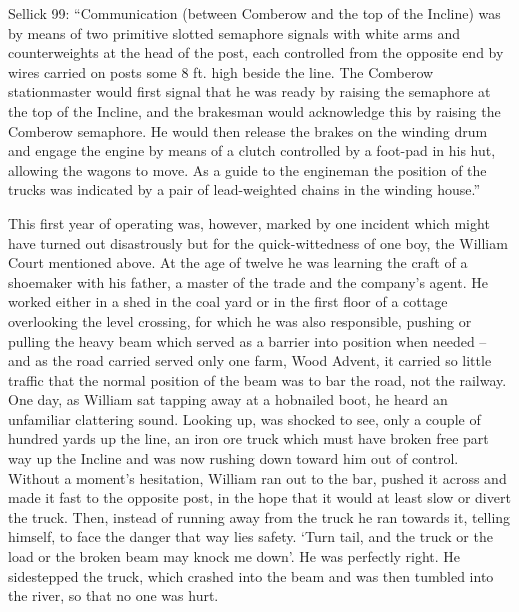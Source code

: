 \documentclass[11pt]{book}
\begin{document}
Sellick 99: “Communication (between Comberow and the top of the Incline) was by means of two primitive slotted semaphore signals with white arms and counterweights at the head of the post, each controlled from the opposite end by wires carried on posts some 8 ft. high beside the line. The Comberow stationmaster would first signal that he was ready by raising the semaphore at the top of the Incline, and the brakesman would acknowledge this by raising the Comberow semaphore. He would then release the brakes on the winding drum and engage the engine by means of a clutch controlled by a foot-pad in his hut, allowing the wagons to move. As a guide to the engineman the position of the trucks was indicated by a pair of lead-weighted chains in the winding house.”

This first year of operating was, however, marked by one incident which might have turned out disastrously but for the quick-wittedness of one boy, the William Court mentioned above. At the age of twelve he was learning the craft of a shoemaker with his father, a master of the trade and the company’s agent. He worked either in a shed in the coal yard or in the first floor of a cottage overlooking the level crossing, for which he was also responsible, pushing or pulling the heavy beam which served as a barrier into position when needed – and as the road carried served only one farm, Wood Advent, it carried so little traffic that the normal position of the beam was to bar the road, not the railway. One day, as William sat tapping away at a hobnailed boot, he heard an unfamiliar clattering sound. Looking up,  was shocked to see, only a couple of hundred yards up the line, an iron ore truck which must have broken free part way up the Incline and was now rushing down toward him out of control. Without a moment’s hesitation, William ran out to the bar, pushed it across and made it fast to the opposite post, in the hope that it would at least slow or divert the truck. Then, instead of running away from the truck he ran towards it, telling himself, to face the danger that way lies safety. ‘Turn tail, and the truck or the load or the broken beam may knock me down’.  He was perfectly right. He sidestepped the truck, which crashed into the beam and was then tumbled into the river, so that no one was hurt.
\end{document}
